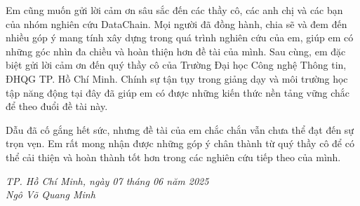 Em cũng muốn gửi lời cảm ơn sâu sắc đến các thầy cô, các anh chị và các bạn của nhóm nghiên cứu DataChain. Mọi người đã đồng hành, chia sẽ và đem đến nhiều góp ý mang tính xây dựng trong quá trình nghiên cứu của em, giúp em có những góc nhìn đa chiều và hoàn thiện hơn đề tài của mình. Sau cùng, em đặc biệt gửi lời cảm ơn đến quý thầy cô của Trường Đại học Công nghệ Thông tin, ĐHQG TP. Hồ Chí Minh. Chính sự tận tụy trong giảng dạy và môi trường học tập năng động tại đây đã giúp em có được những kiến thức nền tảng vững chắc để theo đuổi đề tài này.

Dẫu đã cố gắng hết sức, nhưng đề tài của em chắc chắn vẫn chưa thể đạt đến sự trọn vẹn. Em rất mong nhận được những góp ý chân thành từ quý thầy cô để có thể cải thiện và hoàn thành tốt hơn trong các nghiên cứu tiếp theo của mình.


\begin{flushright}
\textit {TP. Hồ Chí Minh, ngày 07 tháng 06 năm 2025} \\
\textit {Ngô Võ Quang Minh}
\end{flushright}

